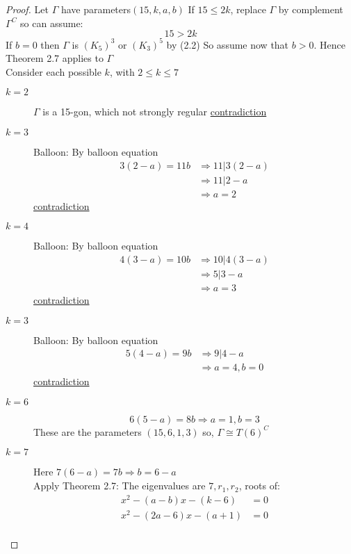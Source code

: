 \documentclass[]{article}
\theoremstyle{definition}
\theoremstyle{remark}
\numberwithin{equation}{section}
\begin{document}
				\begin{proof}
					Let $\Gamma$ have parameters$(15, k, a, b)$ If $15 \leq 2k$, replace $\Gamma$ by complement $\Gamma^C$ so can assume:
					\[ 15 > 2k\]
					If $b=0$ then $\Gamma$ is $(K_5)^3$ or $(K_3)^5$ by (2.2)
					So assume now that $b>0$. Hence Theorem 2.7 applies to $\Gamma$\\
					Consider each possible $k$, with $2 \leq k \leq 7$
					\begin{description}
						\item[$k=2$] $\Gamma$ is a 15-gon, which not strongly regular \underline{contradiction}
						\item[$k=3$] Balloon:
							By balloon equation
							\begin{align*}
								3(2-a) = 11b &\Rightarrow 11 | 3(2-a) \\
									&\Rightarrow 11 | 2-a \\
									&\Rightarrow a = 2
							\end{align*}
							\underline{contradiction}
						\item[$k=4$] Balloon:
							By balloon equation
							\begin{align*}
								4(3-a) = 10b &\Rightarrow 10 | 4(3-a) \\
									&\Rightarrow 5 | 3-a \\
									&\Rightarrow a = 3
							\end{align*}
							\underline{contradiction}
						\item[$k=3$] Balloon:
							By balloon equation
							\begin{align*}
								5(4-a) = 9b &\Rightarrow 9 | 4-a \\
									&\Rightarrow a = 4, b =0
							\end{align*}
							\underline{contradiction}
						\item[$k=6$]
							\[6(5-a) = 8b \Rightarrow a=1, b = 3 \]
							These are the parameters $(15, 6, 1, 3)$ so, $\Gamma \cong T(6)^C$
						\item[$k=7$]
							Here $7(6-a) = 7b \Rightarrow b = 6 - a$\\
							Apply Theorem 2.7:
							The eigenvalues are $7, r_1, r_2$, roots of:
							\begin{align*}
								x^2 - (a - b) x - (k -6 ) &= 0\\
								x^2 - (2a - 6) x - (a + 1) &= 0\\

\end{align*}
\end{description}
\end{proof}
\end{document}
